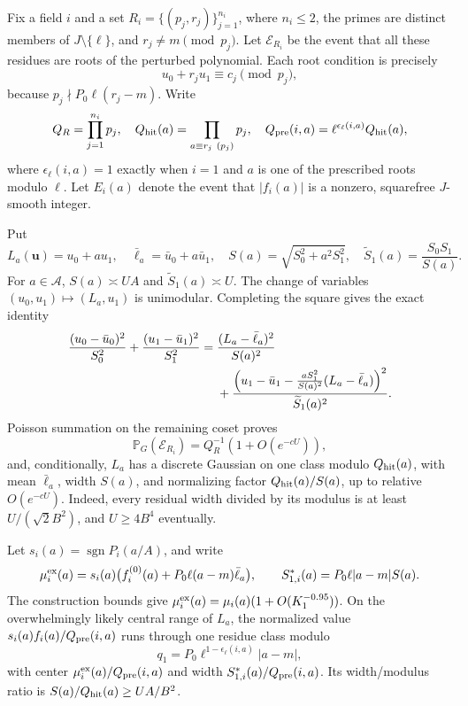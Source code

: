 Fix a field \(i\) and a set
\(R_i=\{(p_j,r_j)\}_{j=1}^{n_i}\), where \(n_i\le2\), the primes
are distinct members of \(J\setminus\{\ell\}\), and
\(r_j\ne m\pmod{p_j}\).  Let \(\mathcal E_{R_i}\) be the event
that all these residues are roots of the perturbed polynomial.
Each root condition is precisely
\begin{equation}\label{eq:root-congruence}
 u_0+r_ju_1\equiv c_j\pmod{p_j},
\end{equation}
because \(p_j\nmid P_0\ell(r_j-m)\).
Write
\[
 Q_R=\prod_{j=1}^{n_i}p_j,\quad
 Q_{\rm hit}(a)=\prod_{a\equiv r_j\ (p_j)}p_j,
 \quad Q_{\rm pre}(i,a)=\ell^{\epsilon_\ell(i,a)}Q_{\rm hit}(a),
\]
where \(\epsilon_\ell(i,a)=1\) exactly when \(i=1\) and \(a\)
is one of the prescribed roots modulo \(\ell\).
Let \(E_i(a)\) denote the event that \(|f_i(a)|\) is a nonzero,
squarefree \(J\)-smooth integer.

Put
\[
 L_a(\mathbf u)=u_0+au_1,\quad
 \bar\ell_a=\bar u_0+a\bar u_1,\quad
 S(a)=\sqrt{S_0^2+a^2S_1^2},\quad
 \widetilde S_1(a)=\frac{S_0S_1}{S(a)}.
\]
For \(a\in\mathcal A\), \(S(a)\asymp UA\) and
\(\widetilde S_1(a)\asymp U\).
The change of variables \((u_0,u_1)\mapsto(L_a,u_1)\) is
unimodular.  Completing the square gives the exact identity
\begin{align}\label{eq:gaussian-square}
 \frac{(u_0-\bar u_0)^2}{S_0^2}
 +\frac{(u_1-\bar u_1)^2}{S_1^2}
 ={}&\frac{(L_a-\bar\ell_a)^2}{S(a)^2}\notag\\
 &+\frac{\left(u_1-\bar u_1-
      \frac{aS_1^2}{S(a)^2}(L_a-\bar\ell_a)\right)^2}
        {\widetilde S_1(a)^2}.
\end{align}
Poisson summation on the remaining coset proves
\begin{equation}\label{eq:root-probability}
 \mathbb P_G(\mathcal E_{R_i})=Q_R^{-1}(1+O(e^{-cU})),
\end{equation}
and, conditionally, \(L_a\) has a discrete Gaussian on one class modulo
\(Q_{\rm hit}(a)\), with mean \(\bar\ell_a\), width \(S(a)\), and
normalizing factor \(Q_{\rm hit}(a)/S(a)\), up to relative
\(O(e^{-cU})\).  Indeed, every residual width divided by its modulus
is at least \(U/(\sqrt2B^2)\), and \(U\ge4B^4\) eventually.

Let \(s_i(a)=\operatorname{sgn}P_i(a/A)\), and write
\[
 \mu_i^{\rm ex}(a)=s_i(a)
   \bigl(f_i^{(0)}(a)+P_0\ell(a-m)\bar\ell_a\bigr),\qquad
 S_{1,i}^*(a)=P_0\ell|a-m|S(a).
\]
The construction bounds give
\(\mu_i^{\rm ex}(a)=\mu_i(a)(1+O(K_1^{-0.95}))\).
On the overwhelmingly likely central range of \(L_a\), the normalized
value \(s_i(a)f_i(a)/Q_{\rm pre}(i,a)\) runs through one residue
class modulo
\begin{equation}\label{eq:q1}
 q_1=P_0\ell^{1-\epsilon_\ell(i,a)}|a-m|,
\end{equation}
with center \(\mu_i^{\rm ex}(a)/Q_{\rm pre}(i,a)\) and width
\(S_{1,i}^*(a)/Q_{\rm pre}(i,a)\).  Its width/modulus ratio is
\(S(a)/Q_{\rm hit}(a)\ge UA/B^2\).

